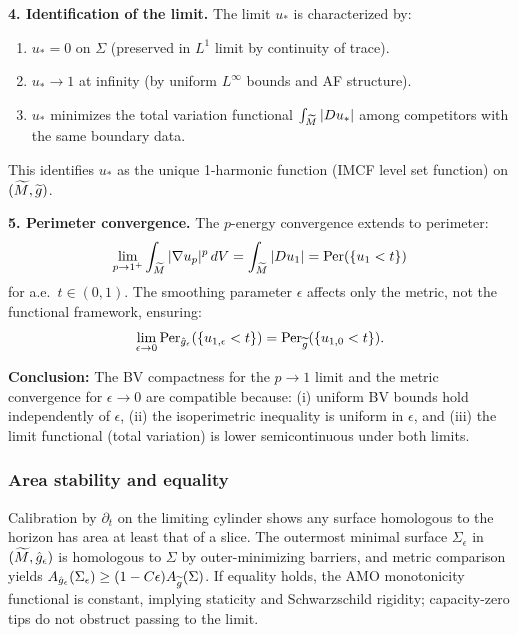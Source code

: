 \begin{remark}
\textbf{4. Identification of the limit.} The limit $u_*$ is characterized by:
\begin{enumerate}
    \item $u_* = 0$ on $\Sigma$ (preserved in $L^1$ limit by continuity of trace).
    \item $u_* \to 1$ at infinity (by uniform $L^\infty$ bounds and AF structure).
    \item $u_*$ minimizes the total variation functional $\int_{\widetilde{M}} |Du_*|$ among competitors with the same boundary data.
\end{enumerate}
This identifies $u_*$ as the unique 1-harmonic function (IMCF level set function) on $(\widetilde{M}, \widetilde{g})$.

\textbf{5. Perimeter convergence.} The $p$-energy convergence extends to perimeter:
\begin{equation}
    \lim_{p \to 1^+} \int_{\widetilde{M}} |\nabla u_p|^p \, dV = \int_{\widetilde{M}} |Du_1| = \text{Per}(\{u_1 < t\})
\end{equation}
for a.e.\ $t \in (0,1)$. The smoothing parameter $\epsilon$ affects only the metric, not the functional framework, ensuring:
\begin{equation}
    \lim_{\epsilon \to 0} \text{Per}_{\hat{g}_\epsilon}(\{u_{1,\epsilon} < t\}) = \text{Per}_{\widetilde{g}}(\{u_{1,0} < t\}).
\end{equation}

\textbf{Conclusion:} The BV compactness for the $p \to 1$ limit and the metric convergence for $\epsilon \to 0$ are compatible because: (i) uniform BV bounds hold independently of $\epsilon$, (ii) the isoperimetric inequality is uniform in $\epsilon$, and (iii) the limit functional (total variation) is lower semicontinuous under both limits.
\end{remark}

\subsubsection{Area stability and equality}
Calibration by $\partial_t$ on the limiting cylinder shows any surface homologous to the horizon has area at least that of a slice. The outermost minimal surface $\Sigma_\epsilon$ in $(\widetilde{M},\hat g_\epsilon)$ is homologous to $\Sigma$ by outer-minimizing barriers, and metric comparison yields $A_{\hat g_\epsilon}(\Sigma_\epsilon)\ge (1-C\epsilon)A_{\widetilde{g}}(\Sigma)$. If equality holds, the AMO monotonicity functional is constant, implying staticity and Schwarzschild rigidity; capacity-zero tips do not obstruct passing to the limit.

